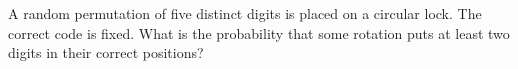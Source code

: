 A random permutation of five distinct digits is placed on a circular lock. The correct code is fixed. What is the probability that some rotation puts at least two digits in their correct positions?

